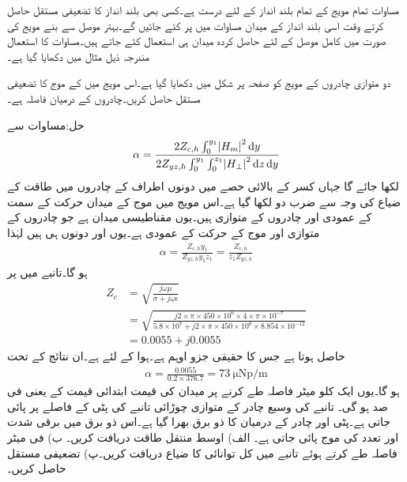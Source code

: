 مساوات  تمام مویج کے تمام بلند انداز کے لئے درست ہے۔کسی بھی بلند انداز کا تضعیفی مستقل حاصل کرتے وقت اسی بلند انداز کے میدان مساوات  میں پر کئے جائیں گے۔بہتر موصل سے بنے مویج کی صورت میں کامل موصل کے لئے حاصل کردہ میدان ہی استعمال کئے جاتے ہیں۔مساوات  کا استعمال مندرجہ ذیل مثال میں دکھایا گیا ہے۔

دو متوازی چادروں کے مویج کو صفحہ  پر شکل  میں دکھایا گیا ہے۔اس مویج میں  کے  موج کا تضعیفی مستقل حاصل کریں۔چادروں کے درمیان فاصلہ  ہے۔

حل:مساوات   سے
\begin{align*}
\alpha=\frac{2 Z_{c,h} \int_0^{y_1} \abs{H_m}^2 \dif y}{2 Z_{yz,h} \int_0^{y_1} \int_0^{z_1} \abs{H_{\perp}}^2 \dif z \dif y}
\end{align*}
لکھا جائے گا جہاں کسر کے بالائی حصے میں دونوں اطراف کے چادروں میں طاقت کے ضیاع کی وجہ سے ضرب دو لکھا گیا ہے۔اس مویج میں  موج کے میدان حرکت کے سمت کے عمودی اور چادروں کے متوازی ہیں۔یوں مقناطیسی میدان  ہے جو چادروں کے متوازی اور موج کے حرکت کے عمودی ہے۔یوں  اور  دونوں   ہی ہیں لہٰذا
 \begin{align*}
\alpha=\frac{Z_{c,h} y_1}{Z_{yz,h} y_1 z_1}=\frac{Z_{c,h}}{z_1 Z_{yz,h}}
\end{align*}
ہو گا۔تانبے میں  پر
\begin{align*}
Z_{c}&=\sqrt{\frac{j\omega \mu}{\sigma+j\omega \epsilon}}\\
&=\sqrt{\frac{j 2 \times \pi \times 450 \times 10^{6} \times 4 \times \pi \times 10^{-7}}{5.8\times 10^{7}+j 2\times \pi \times 450 \times 10^{6} \times 8.854 \times 10^{-12}}}\\
&=0.0055+j0.0055
\end{align*}
حاصل ہوتا ہے جس کا حقیقی جزو  اوہم ہے۔ہوا کے لئے  ہے۔ان نتائج کے تحت
 \begin{align*}
\alpha=\frac{0.0055}{0.2 \times  376.7}=\SI{73}{\micro\neper/\meter} 
\end{align*}
ہو گا۔یوں ایک کلو میٹر فاصلہ طے کرنے پر میدان کی قیمت ابتدائی قیمت کے  یعنی  فی صد ہو گی۔
تانبے کی وسیع چادر کے متوازی  چوڑائی تانبے کی پٹی  کے فاصلے پر پائی جاتی ہے۔پٹی اور چادر کے درمیان  کا ذو برق بھرا گیا ہے۔اس ذو برق میں  برقی شدت اور  تعدد کی  موج پائی جاتی ہے۔ الف) اوسط منتقل طاقت دریافت کریں۔ ب) فی میٹر فاصلہ طے کرتے ہوئے تانبے میں کل توانائی کا ضیاع دریافت کریں۔پ) تضعیفی مستقل حاصل کریں۔

